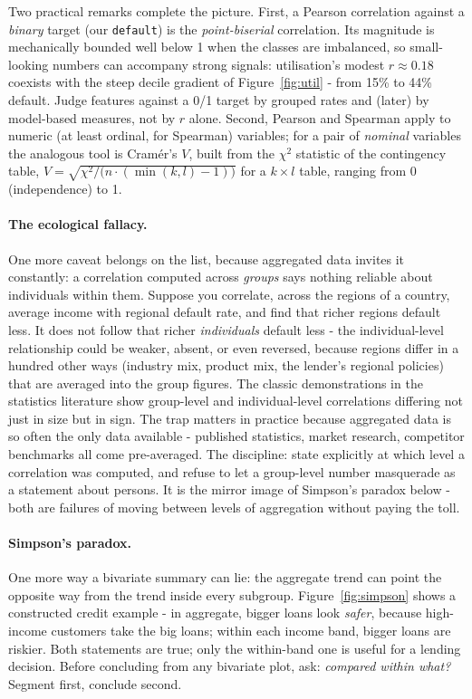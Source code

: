 \documentclass[11pt,a4paper]{article}
\begin{document}
Two practical remarks complete the picture. First, a Pearson correlation
against a \emph{binary} target (our \texttt{default}) is the
\emph{point-biserial} correlation. Its magnitude is mechanically bounded
well below 1 when the classes are imbalanced, so small-looking numbers can
accompany strong signals: utilisation's modest $r \approx 0.18$ coexists
with the steep decile gradient of Figure~\ref{fig:util} - from 15\% to
44\% default. Judge features against a 0/1 target by grouped rates and
(later) by model-based measures, not by $r$ alone. Second, Pearson and
Spearman apply to numeric (at least ordinal, for Spearman) variables; for a
pair of \emph{nominal} variables the analogous tool is Cramér's $V$, built
from the $\chi^2$ statistic of the contingency table,
$V=\sqrt{\chi^{2}/\bigl(n\cdot(\min(k,l)-1)\bigr)}$ for a $k \times l$
table, ranging from 0 (independence) to 1.

\paragraph{The ecological fallacy.} One more caveat belongs on the list,
because aggregated data invites it constantly: a correlation computed
across \emph{groups} says nothing reliable about individuals within them.
Suppose you correlate, across the regions of a country, average income
with regional default rate, and find that richer regions default less. It
does not follow that richer \emph{individuals} default less - the
individual-level relationship could be weaker, absent, or even reversed,
because regions differ in a hundred other ways (industry mix, product mix,
the lender's regional policies) that are averaged into the group figures.
The classic demonstrations in the statistics literature show group-level
and individual-level correlations differing not just in size but in sign.
The trap matters in practice because aggregated data is so often the only
data available - published statistics, market research, competitor
benchmarks all come pre-averaged. The discipline: state explicitly at
which level a correlation was computed, and refuse to let a group-level
number masquerade as a statement about persons. It is the mirror image of
Simpson's paradox below - both are failures of moving between levels of
aggregation without paying the toll.

\paragraph{Simpson's paradox.} One more way a bivariate summary can lie:
the aggregate trend can point the opposite way from the trend inside every
subgroup. Figure~\ref{fig:simpson} shows a constructed credit example -
in aggregate, bigger loans look \emph{safer}, because high-income customers
take the big loans; within each income band, bigger loans are riskier. Both
statements are true; only the within-band one is useful for a lending
decision. Before concluding from any bivariate plot, ask: \emph{compared
within what?} Segment first, conclude second.
\end{document}
